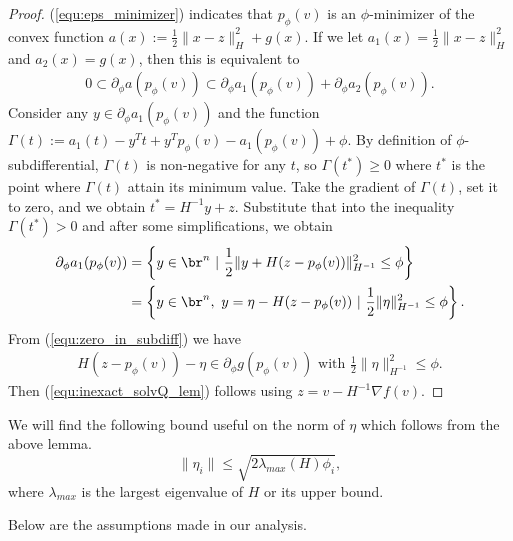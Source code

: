 \documentclass[11pt]{article}
\numberwithin{equation}{section}
\begin{document}
\begin{proof}
    (\ref{equ:eps_minimizer}) indicates that $p_{\phi}(v)$ is an $\phi$-minimizer of the convex function $a(x) := \frac{1}{2}\|x-z\|_H^2+g(x)$. If we let $a_1(x) = \frac{1}{2}\|x-z\|_H^2$ and $a_2(x) = g(x)$, then this is equivalent to
    \begin{align}
        \label{equ:zero_in_subdiff}
        0 \subset \partial_{\phi} a(p_{\phi}(v)) \subset \partial_{\phi} a_1(p_{\phi}(v)) + \partial_{\phi} a_2(p_{\phi}(v)).
    \end{align}
    Consider any $y \in \partial_{\phi} a_1(p_{\phi}(v))$ and the function $\Gamma(t) := a_1(t) - y^Tt +y^Tp_{\phi}(v) - a_1(p_{\phi}(v)) + \phi$.
    By definition of $\phi$-subdifferential, $\Gamma(t)$ is non-negative for any $t$, so $\Gamma(t^*) \geq 0$ where $t^*$ is the point where $\Gamma(t)$ attain its minimum value. Take the gradient of $\Gamma(t)$, set it to zero, and we obtain $t^* = H^{-1}y + z$. Substitute that into the inequality $\Gamma(t^*) > 0$ and after some simplifications, we obtain 
    \begin{align*}
        \partial_{\phi} a_1(p_{\phi}(v)) &= \left\{ y \in \br^n ~|~ \frac{1}{2} \| y + H(z-p_{\phi}(v)) \|^2_{H^{-1}} \leq \phi \right\} \\
        &= \left\{ y \in \br^n, ~y = \eta - H(z-p_{\phi}(v)) ~|~ \frac{1}{2} \|\eta\|^2_{H^{-1}} \leq \phi \right\}.
    \end{align*}
    From (\ref{equ:zero_in_subdiff}) we have
    \begin{align}
        H(z-p_{\phi}(v)) - \eta \in \partial_{\phi}g(p_{\phi}(v)) \mbox{ with } \frac{1}{2} \|\eta\|^2_{H^{-1}} \leq \phi.
    \end{align}
    Then (\ref{equ:inexact_solvQ_lem}) follows using $z = v - H^{-1} \nabla f(v)$.
\end{proof}

We will find the following bound useful on the norm of $\eta$ which follows from the above lemma.
\begin{equation}\label{eq:etabound}
\|\eta_i\|\leq \sqrt{2\lambda_{max}(H)\phi_i},
\end{equation}
where $\lambda_{max}$ is the largest eigenvalue of $H$ or its upper bound. 

Below are the assumptions made in our analysis.
\end{document}
